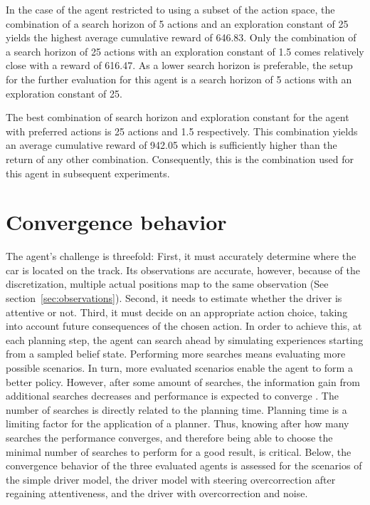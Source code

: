 In the case of the agent restricted to using a subset of the action space, the combination of a search horizon of 5 actions and an exploration constant of 25 yields the highest average cumulative reward of 646.83. Only the combination of a search horizon of 25 actions with an exploration constant of 1.5 comes relatively close with a reward of 616.47. As a lower search horizon is preferable, the setup for the further evaluation for this agent is a search horizon of 5 actions with an exploration constant of 25. 

The best combination of search horizon and exploration constant for the agent with preferred actions is 25 actions and 1.5 respectively. This combination yields an average cumulative reward of 942.05 which is sufficiently higher than the return of any other combination. Consequently, this is the combination used for this agent in subsequent experiments.

\section{Convergence behavior}
\label{sec:convergence}




The agent's challenge is threefold: First, it must accurately determine where the car is located on the track. Its observations are accurate, however, because of the discretization, multiple actual positions map to the same observation (See section~\ref{sec:observations}). Second, it needs to estimate whether the driver is attentive or not. Third, it must decide on an appropriate action choice, taking into account future consequences of the chosen action. In order to achieve this, at each planning step, the agent can search ahead by simulating experiences starting from a sampled belief state. Performing more searches means evaluating more possible scenarios. In turn, more evaluated scenarios enable the agent to form a better policy. However, after some amount of searches, the information gain from additional searches decreases and performance is expected to converge \parencite{pomcp}. The number of searches is directly related to the planning time. Planning time is a limiting factor for the application of a planner. Thus, knowing after how many searches the performance converges, and therefore being able to choose the minimal number of searches to perform for a good result, is critical. Below, the convergence behavior of the three evaluated agents is assessed for the scenarios of the simple driver model, the driver model with steering overcorrection after regaining attentiveness, and the driver with overcorrection and noise.

